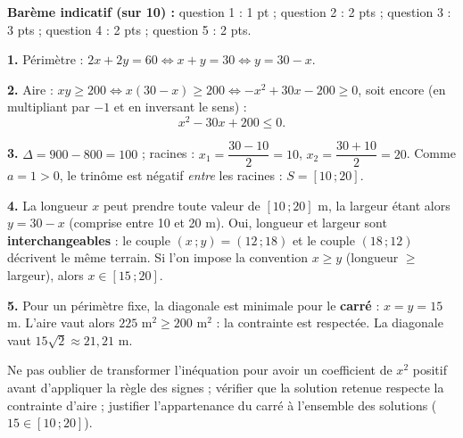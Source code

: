 \documentclass[11pt]{article}
\begin{document}
\begin{corrige}
\textbf{Barème indicatif (sur 10) :} question 1 : 1 pt ; question 2 : 2 pts ; question 3 : 3 pts ; question 4 : 2 pts ; question 5 : 2 pts.

\textbf{1.} Périmètre : $2x + 2y = 60 \iff x + y = 30 \iff y = 30 - x$.

\textbf{2.} Aire : $xy \ge 200 \iff x(30 - x) \ge 200 \iff -x^2 + 30x - 200 \ge 0$, soit encore (en multipliant par $-1$ et en inversant le sens) :
\[ x^2 - 30x + 200 \le 0. \]

\textbf{3.} $\Delta = 900 - 800 = 100$ ; racines : $x_1 = \dfrac{30 - 10}{2} = 10$, $x_2 = \dfrac{30 + 10}{2} = 20$. Comme $a = 1 > 0$, le trinôme est négatif \emph{entre} les racines : $S = [10\,; 20]$.

\textbf{4.} La longueur $x$ peut prendre toute valeur de $[10\,; 20]$ m, la largeur étant alors $y = 30 - x$ (comprise entre 10 et 20 m). Oui, longueur et largeur sont \textbf{interchangeables} : le couple $(x\,; y) = (12\,; 18)$ et le couple $(18\,; 12)$ décrivent le même terrain. Si l'on impose la convention $x \ge y$ (longueur $\ge$ largeur), alors $x \in [15\,; 20]$.

\textbf{5.} Pour un périmètre fixe, la diagonale est minimale pour le \textbf{carré} : $x = y = 15$ m. L'aire vaut alors $225 \text{ m}^2 \ge 200 \text{ m}^2$ : la contrainte est respectée. La diagonale vaut $15\sqrt{2} \approx 21,21$ m.

\begin{attention}
Ne pas oublier de transformer l'inéquation pour avoir un coefficient de $x^2$ positif avant d'appliquer la règle des signes ; vérifier que la solution retenue respecte la contrainte d'aire ; justifier l'appartenance du carré à l'ensemble des solutions ($15 \in [10\,;20]$).
\end{attention}
\end{corrige}
\end{document}
